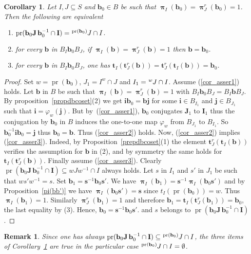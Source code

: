\documentclass{amsart}
\numberwithin{equation}{section}
\newtheorem{corollary}[equation]{Corollary}
\newtheorem{remark}[equation]{Remark}
\newcommand\lexp[2]{\kern\scriptspace\vphantom{#2}^{#1}\kern-\scriptspace#2}
\newcommand\inv{^{-1}}
\newcommand\bb{{\mathbf b}}
\newcommand\bi{{\mathbf i}}
\newcommand\bj{{\mathbf j}}
\newcommand\bs{{\mathbf s}}
\newcommand\bt{{\mathbf t}}
\newcommand\bI{{\mathbf I}}
\newcommand\bJ{{\mathbf J}}
\DeclareMathOperator\pr{pr}
\DeclareMathOperator\bpi{\boldsymbol\pi}
\begin{document}
\begin{corollary}\label{unique representative}
Let  $I,J\subseteq S$ and $\bb_0\in B$ be such that
$\bpi_I(\bb_0) = \bpi^r_J(\bb_0) = 1$.  Then the
following are equivalent
\begin{enumerate}
\item \label{cor_asser1} $\pr(\bb_0 \bJ\, \bb_0\inv \cap  \bI) = \lexp{\pr(\bb_0)} J \cap  I$.
\item \label{cor_asser2} for every  $\bb$ in $B_I\bb_0 B_J$, if $\bpi_I(\bb) =
 \bpi^r_J(\bb) = 1$ then $\bb = \bb_0$.
\item \label{cor_asser3} for every $\bb$ in $B_I\bb_0 B_J$, one has
$\bt_I(\bt^r_J(\bb))  = \bt^r_J(\bt_I(\bb)) = \bb_0$.
\end{enumerate}
\end{corollary}

\begin{proof} Set $w  = \pr(\bb_0)$,  $J_1 = I^w\cap J$ and $I_1 = \lexp w J \cap
I$.  Assume  (\ref{cor_asser1})  holds.  Let  $\bb$  in  $B$ be such that
$\bpi_I(\bb)  = \bpi^r_J(\bb)  = 1$  with $B_I\bb_0  B_J = B_I\bb
B_J$. By proposition~\ref{propdbcoset}(2) we
get $\bi\bb_0 = \bb\bj$ for some
$\bi \in B_{I_1}$ and  $\bj\in B_{J_1}$ such that $\bi = \varphi_{w}(\bj)$. But
by~(\ref{cor_asser1}),  $\bb_0$ conjugates $\bJ_1$ to $\bI_1$ thus 
the  conjugation  by  $\bb_0$  in  $B$  induces the
one-to-one  map  $\varphi_w$  from $B_{J_1}$  to $B_{I_1}$. So 
$\bb_0\inv\bi\bb_0=\bj$ thus $\bb_0=\bb$.
Thus    (\ref{cor_asser2})    holds.    Now,   (\ref{cor_asser2})   implies
(\ref{cor_asser3}). Indeed, by Proposition~\ref{prepdbcoset}(1)
 the element $\bt^r_J(\bt_I(\bb))$ verifies the assumption for $\bb$ in (2), 
and   by   symmetry  the same holds for $\bt_I(\bt^r_J(\bb))$.
Finally assume (\ref{cor_asser3}). Clearly
$\pr(\bb_0 \bJ\,  \bb_0\inv \cap  \bI) \subseteq  w J w\inv \cap I$
always  holds. Let $s$ in $I_1$ and $s'$ in $J_1$ be such that $ws'w\inv =
s$.  Set $\bb_1 = \bs\inv \bb_0\bs'$.  We have
$\bpi_I(\bb_1) =\bs\inv\bpi_I(\bb_0\bs')$ and by Proposition~\ref{pi(bb')}
we have $\bpi_I(\bb_0\bs')=\bs$ since $t_I(\pr(\bb_0))=w$.
Thus $\bpi_I(\bb_1)=1$. Similarly
$\bpi_J^r(\bb_1)  = 1$ and therefore $\bb_1 = \bt_I(\bt^r_J(\bb_1)) = \bb_0$, the
last equality by (3).
Hence,  $\bb_0 = \bs\inv \bb_0\bs'$. and  $s$ belongs to $\pr(\bb_0 \bJ\,
\bb_0\inv \cap \bI)$.
\end{proof}

\begin{remark}\label{intersection empty} Since one has always  
$\pr(\bb_0 \bJ\, \bb_0\inv \cap  \bI) \subseteq \lexp {\pr(\bb_0)} J \cap  I$,
the three items of Corollary~\ref{unique representative} are true in the particular case
$\lexp {\pr(\bb_0)} J \cap  I = \emptyset$.
\end{remark}
\end{document}

